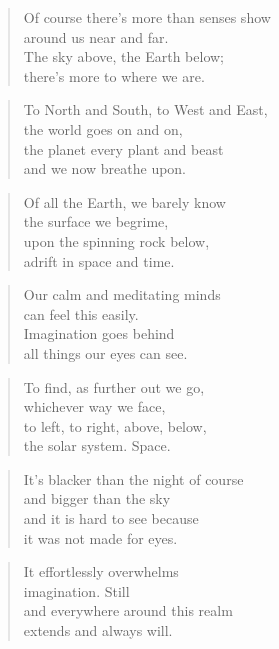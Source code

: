 \documentclass[14pt,a4paper]{article}
\begin{document}
\begin{verse}
Of course there’s more than senses show\\
around us near and far.\\
The sky above, the Earth below;\\
there’s more to where we are.
\end{verse}

\begin{verse}
To North and South, to West and East,\\
the world goes on and on,\\
the planet every plant and beast\\
and we now breathe upon.
\end{verse}

\begin{verse}
Of all the Earth, we barely know\\
the surface we begrime,\\
upon the spinning rock below,\\
adrift in space and time.
\end{verse}

\begin{verse}
Our calm and meditating minds\\
can feel this easily.\\
Imagination goes behind\\
all things our eyes can see.
\end{verse}

\begin{verse}
To find, as further out we go,\\
whichever way we face,\\
to left, to right, above, below,\\
the solar system. Space.
\end{verse}

\begin{verse}
It’s blacker than the night of course\\
and bigger than the sky\\
and it is hard to see because\\
it was not made for eyes.
\end{verse}

\begin{verse}
It effortlessly overwhelms\\
imagination. Still\\
and everywhere around this realm\\
extends and always will.
\end{verse}
\end{document}
